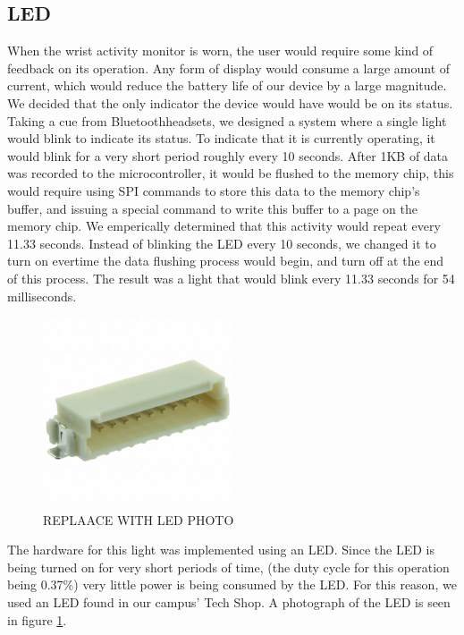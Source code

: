 \subsection{LED}
\label{Sec:LED}
When the wrist activity monitor is worn,
the user would require some kind of feedback on its operation.
Any form of display would consume a large amount of current,
which would reduce the battery life of our device by a large magnitude.
We decided that the only indicator the device would have would be on its status.
Taking a cue from Bluetooth\texttrademark headsets,
we designed a system where a single light would blink to indicate its status.
To indicate that it is currently operating, it would blink for a very short period roughly every 10 seconds.
After 1KB of data was recorded to the microcontroller, it would be flushed to the memory chip,
this would require using SPI commands to store this data to the memory chip's buffer,
and issuing a special command to write this buffer to a page on the memory chip.
We emperically determined that this activity would repeat every 11.33 seconds.
Instead of blinking the LED every 10 seconds, we changed it to turn on evertime the data flushing process would begin,
and turn off at the end of this process.
The result was a light that would blink every 11.33 seconds for 54 milliseconds.
\begin{figure}
\begin{center}
\includegraphics[width=0.5\textwidth]{images/ConnectorWhole.JPG}
\caption{REPLAACE WITH LED PHOTO}
\label{Fig:LEDPHOTO}
\end{center}
\end{figure}
The hardware for this light was implemented using an LED.
Since the LED is being turned on for very short periods of time, 
(the duty cycle for this operation being 0.37\%) very little power is being consumed by the LED.
For this reason, we used an LED found in our campus' Tech Shop. A photograph of the LED is seen in figure \ref{Fig:LEDPHOTO}.

